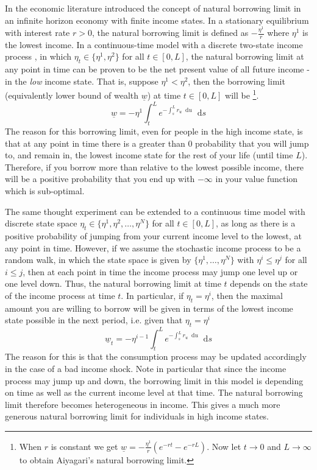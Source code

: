 \documentclass[11pt,oneside,english,reqno,dvipsnames,table]{amsart}
\numberwithin{equation}{section}
\theoremstyle{plain}
\theoremstyle{definition}
\theoremstyle{remark}
\theoremstyle{plain}
\theoremstyle{plain}
\theoremstyle{plain}
\theoremstyle{plain}
\theoremstyle{plain}
\theoremstyle{plain}
\theoremstyle{plain}
\newcommand{\dd}{\mathop{}\!\mathrm{d}}
\numberwithin{thm}{section}
\begin{document}
In the economic literature \cite{aiyagari_94_uninsured} introduced the concept of natural borrowing limit in an infinite horizon economy with finite income states. In a stationary equilibrium with interest rate $r>0$, the natural borrowing limit is defined as $-\frac{\eta^1}{r}$ where $\eta^1$ is the lowest income. 
In a continuous-time  model with a discrete two-state income process \cite{achdou_francisco_lasry_lions_moll_14_pde}, in which $\eta_t\in \{ \eta^1,\eta^2\}$ for all $t\in [0,L]$, the natural borrowing limit at any point in time  can be proven to be the net present value of all future income - in the {\em low} income state. That is, suppose $\eta^1< \eta^2$, then the borrowing limit (equivalently lower bound of wealth $\underline{w}$) at time $t\in [0,L]$ will be 
\footnote{When $r$ is constant we get $\underline{w} = -{\frac{\eta^1}{r}}\left(e^{-rt}-e^{-rL}\right)$. Now let $t\to 0$ and $L\to \infty$ to obtain Aiyagari's natural borrowing limit.}.
%
\[\underline{w}=-\eta^1 \int_t^L  e^{-\int_s^L r_u \dd u }\dd s \]
%
The reason for this borrowing limit, even for people in the high income state,  is that at any point in time there is a greater than $0$ probability that you will jump to, and remain in, the lowest income state for the rest of your life (until time $L$). Therefore, if you borrow more than relative to the lowest possible income, there will be a positive probability that you end up with $-\infty$ in your value function which is sub-optimal.

The same thought experiment can be extended to a continuous time model with discrete state space $\eta_t\in \{ \eta^1,\eta^2,\ldots, \eta^N\}$ for all $t\in [0,L]$, as long as there is a positive probability of jumping from your current income level to the lowest, at any point in time. 
However, if we  assume the stochastic income process to be a random walk, in which the state space is given by $\{\eta^1,\ldots, \eta^N\}$ with $\eta^i\leq \eta^j$ for all $i\leq j$, then at each point in time the income process may jump one level up or one level down. Thus, the natural borrowing limit at time $t$ depends on the state of the income process at time $t$. In particular, if $\eta_t=\eta^i$, then the maximal amount you are willing to borrow will be given in terms of the lowest income state possible in the next period, i.e. given that $\eta_t=\eta^i$
%
\[
\underline{w}_t = -\eta^{i-1} \int_t^L  e^{-\int_s^L r_u \dd u }\dd s
\]
%
 The reason for this is that the consumption process may be updated accordingly in the case of a bad income shock. Note in particular that since the income process may jump up and down, the borrowing limit in this model is depending on time as well as the current income level at that time. The natural borrowing limit therefore becomes heterogeneous in income. This gives a much more generous natural borrowing limit for individuals in high income states. 
\end{document}
